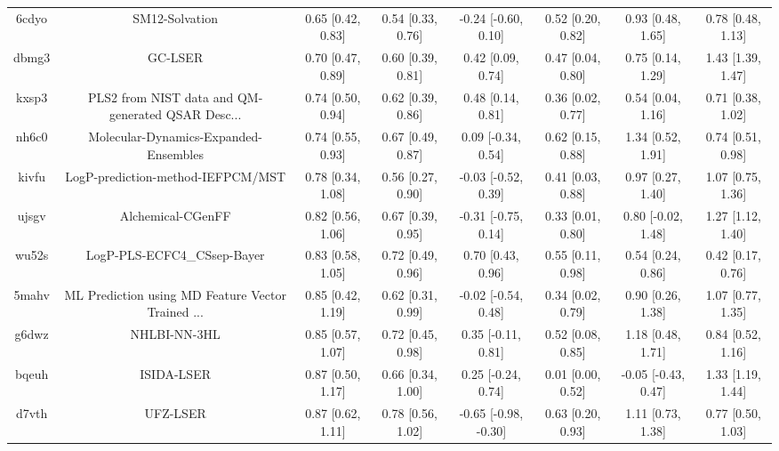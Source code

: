 \documentclass{article}
\begin{document}
\begin{center}
\begin{longtable}{|cccccccc|}
 6cdyo &                                     SM12-Solvation &  0.65 [0.42, 0.83] &  0.54 [0.33, 0.76] &   -0.24 [-0.60, 0.10] &  0.52 [0.20, 0.82] &    0.93 [0.48, 1.65] &     0.78 [0.48, 1.13] \\
 dbmg3 &                                            GC-LSER &  0.70 [0.47, 0.89] &  0.60 [0.39, 0.81] &     0.42 [0.09, 0.74] &  0.47 [0.04, 0.80] &    0.75 [0.14, 1.29] &     1.43 [1.39, 1.47] \\
 kxsp3 &  PLS2 from NIST data and QM-generated QSAR Desc... &  0.74 [0.50, 0.94] &  0.62 [0.39, 0.86] &     0.48 [0.14, 0.81] &  0.36 [0.02, 0.77] &    0.54 [0.04, 1.16] &     0.71 [0.38, 1.02] \\
 nh6c0 &              Molecular-Dynamics-Expanded-Ensembles &  0.74 [0.55, 0.93] &  0.67 [0.49, 0.87] &    0.09 [-0.34, 0.54] &  0.62 [0.15, 0.88] &    1.34 [0.52, 1.91] &     0.74 [0.51, 0.98] \\
 kivfu &                  LogP-prediction-method-IEFPCM/MST &  0.78 [0.34, 1.08] &  0.56 [0.27, 0.90] &   -0.03 [-0.52, 0.39] &  0.41 [0.03, 0.88] &    0.97 [0.27, 1.40] &     1.07 [0.75, 1.36] \\
 ujsgv &                                  Alchemical-CGenFF &  0.82 [0.56, 1.06] &  0.67 [0.39, 0.95] &   -0.31 [-0.75, 0.14] &  0.33 [0.01, 0.80] &   0.80 [-0.02, 1.48] &     1.27 [1.12, 1.40] \\
 wu52s &                        LogP-PLS-ECFC4\_CSsep-Bayer &  0.83 [0.58, 1.05] &  0.72 [0.49, 0.96] &     0.70 [0.43, 0.96] &  0.55 [0.11, 0.98] &    0.54 [0.24, 0.86] &     0.42 [0.17, 0.76] \\
 5mahv &  ML Prediction using MD Feature Vector Trained ... &  0.85 [0.42, 1.19] &  0.62 [0.31, 0.99] &   -0.02 [-0.54, 0.48] &  0.34 [0.02, 0.79] &    0.90 [0.26, 1.38] &     1.07 [0.77, 1.35] \\
 g6dwz &                                       NHLBI-NN-3HL &  0.85 [0.57, 1.07] &  0.72 [0.45, 0.98] &    0.35 [-0.11, 0.81] &  0.52 [0.08, 0.85] &    1.18 [0.48, 1.71] &     0.84 [0.52, 1.16] \\
 bqeuh &                                         ISIDA-LSER &  0.87 [0.50, 1.17] &  0.66 [0.34, 1.00] &    0.25 [-0.24, 0.74] &  0.01 [0.00, 0.52] &  -0.05 [-0.43, 0.47] &     1.33 [1.19, 1.44] \\
 d7vth &                                           UFZ-LSER &  0.87 [0.62, 1.11] &  0.78 [0.56, 1.02] &  -0.65 [-0.98, -0.30] &  0.63 [0.20, 0.93] &    1.11 [0.73, 1.38] &     0.77 [0.50, 1.03] \\

\end{longtable}
\end{center}
\end{document}
